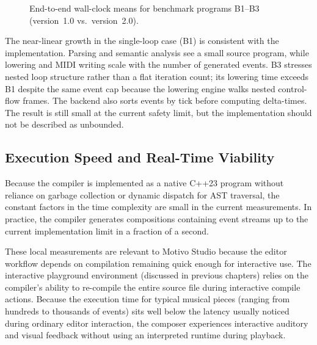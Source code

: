 \begin{figure}[htbp]
  \centering
  \caption{End-to-end wall-clock means for benchmark programs B1--B3 (version~1.0 vs.\ version~2.0).}%
  \label{fig:benchmark-time}
\end{figure}

The near-linear growth in the single-loop case (B1) is consistent with the implementation.
Parsing and semantic analysis see a small source program, while lowering and MIDI writing scale with the number of
generated events.
B3 stresses nested loop structure rather than a flat iteration count; its lowering time exceeds B1 despite
the same event
cap because the lowering engine walks nested control-flow frames.
The backend also sorts events by tick before computing delta-times.
The result is still small at the current safety limit, but the implementation should not be described as unbounded.

\subsection{Execution Speed and Real-Time Viability}\label{detail-subsec:execution-speed-and-real-time-viability}

Because the compiler is implemented as a native C++23 program without reliance on garbage collection or dynamic dispatch
for AST traversal, the constant factors in the time complexity are small in the current measurements.
In practice, the compiler generates compositions containing event streams up to the current implementation limit in a
fraction of a second.

These local measurements are relevant to Motivo Studio because the editor workflow depends on compilation remaining
quick enough for interactive use.
The interactive playground environment (discussed in previous chapters) relies on the compiler's ability to re-compile
the entire source file during interactive compile actions.
Because the execution time for typical musical pieces (ranging from hundreds to thousands of events) sits well below the
latency usually noticed during ordinary editor interaction, the composer experiences interactive auditory and visual
feedback without using an interpreted runtime during playback.
